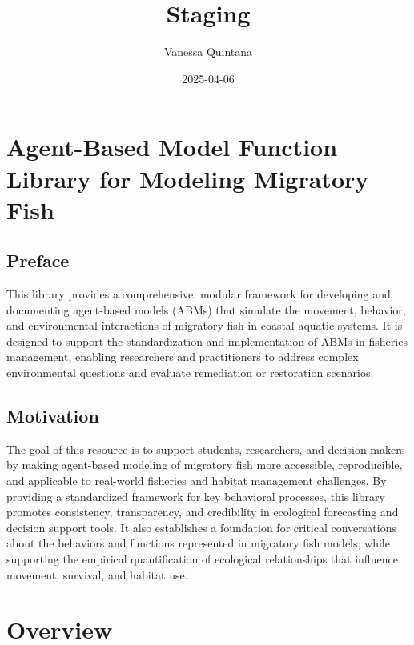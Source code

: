 \documentclass[
]{book}
\title{Staging}
\author{Vanessa Quintana}
\date{2025-04-06}
\begin{document}
\maketitle

{
\setcounter{tocdepth}{1}
\tableofcontents
}
\chapter*{Agent-Based Model Function Library for Modeling Migratory Fish}\label{agent-based-model-function-library-for-modeling-migratory-fish}

\section*{Preface}\label{preface}

This library provides a comprehensive, modular framework for developing and documenting agent-based models (ABMs) that simulate the movement, behavior, and environmental interactions of migratory fish in coastal aquatic systems. It is designed to support the standardization and implementation of ABMs in fisheries management, enabling researchers and practitioners to address complex environmental questions and evaluate remediation or restoration scenarios.

\section*{Motivation}\label{motivation}

The goal of this resource is to support students, researchers, and decision-makers by making agent-based modeling of migratory fish more accessible, reproducible, and applicable to real-world fisheries and habitat management challenges. By providing a standardized framework for key behavioral processes, this library promotes consistency, transparency, and credibility in ecological forecasting and decision support tools. It also establishes a foundation for critical conversations about the behaviors and functions represented in migratory fish models, while supporting the empirical quantification of ecological relationships that influence movement, survival, and habitat use.

\chapter{Overview}\label{overview}
\end{document}
